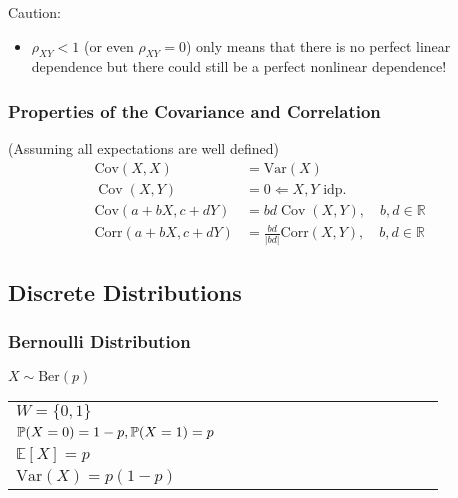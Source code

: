 Caution:
\begin{itemize}
    \item $\rho_{XY}<1$ (or even $\rho_{XY}=0$) only means that there is no perfect linear dependence but there could still be a perfect nonlinear dependence!
\end{itemize}

\subsubsection{Properties of the Covariance and Correlation}
(Assuming all expectations are well defined)
\noindent\begin{align*}
    \mathrm{Cov}(X,X)        & = \mathrm{Var}(X)                                           \\
    \operatorname{Cov}(X,Y)  & = 0 \Leftarrow X,Y\text{ idp.}                              \\
    \mathrm{Cov}(a+bX,c+dY)  & =bd\operatorname{Cov}(X,Y),\quad b,d\in\mathbb{R}           \\
    \mathrm{Corr}(a+bX,c+dY) & ={\frac{bd}{|bd|}}\mathrm{Corr}(X,Y),\quad b,d\in\mathbb{R}
\end{align*}

\subsection{Discrete Distributions}

\subsubsection{Bernoulli Distribution}
$X \sim \mathrm{Ber}(p)$

\renewcommand{\arraystretch}{1.3}
\setlength{\oldtabcolsep}{\tabcolsep}\setlength\tabcolsep{3pt}

\begin{tabularx}{\linewidth}{@{}p{0.5\linewidth}p{0.49\linewidth}@{}}
    $W=\{0,1\}$                                     &
    \multirow{4}{*}{
        
    }                                                 \\
    $\mathbb{P}(X=0)=1-p,\newline\mathbb{P}(X=1)=p$ & \\
    $\mathbb{E}[X] = p$                             & \\
    $\mathrm{Var}(X) = p(1-p)$                      &
\end{tabularx}

